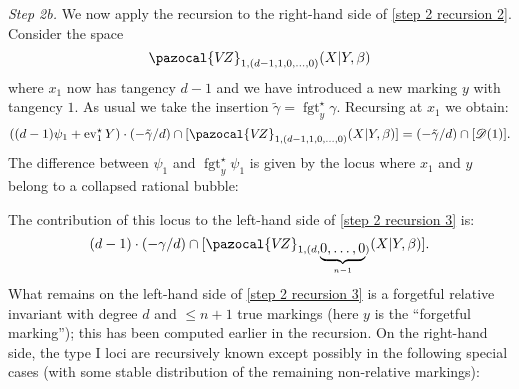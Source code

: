 \documentclass[11pt]{amsart}
\newcommand{\sqC}{\scalebox{0.8}[1.3]{$\sqsubset$}}
\newcommand{\VZ}{\pazocal{V\!Z}}
\newcommand{\st}{\star}
\newcommand{\ev}{\operatorname{ev}}
\newcommand{\fgt}{\operatorname{fgt}}
\newcommand{\Dcal}{\mathcal{D}}
\theoremstyle{definition}
\theoremstyle{definition}
\begin{document}
\noindent \emph{Step 2b.} We now apply the recursion to the right-hand side of \eqref{step 2 recursion 2}. Consider the space
\begin{equation*} \VZ_{1,(d-1,1,0,\ldots,0)}(X|Y,\beta) \end{equation*}
where $x_1$ now has tangency $d-1$ and we have introduced a new marking $y$ with tangency $1$. As usual we take the insertion $\tilde\gamma=\fgt_y^\st \gamma$. Recursing at $x_1$ we obtain:
\begin{equation}\label{step 2 recursion 3} \left( (d-1)\psi_1 + \ev_1^\st Y \right)\cdot(-\tilde\gamma/d) \cap [\VZ_{1,(d-1,1,0,\ldots,0)}(X|Y,\beta)] = (-\tilde\gamma/d) \cap [\Dcal(1)].\end{equation}
The difference between $\psi_1$ and $\fgt_y^\st \psi_1$ is given by the locus where $x_1$ and $y$ belong to a collapsed rational bubble:
\begin{center}
\end{center}
The contribution of this locus to the left-hand side of \eqref{step 2 recursion 3} is:
\begin{equation*} (d-1)\cdot(-\gamma/d) \cap [\VZ_{1,(d,\underbrace{0,\ldots,0}_{n-1})}(X|Y,\beta)].\end{equation*}
What remains on the left-hand side  of \eqref{step 2 recursion 3} is a forgetful relative invariant with degree $d$ and $\leq n+1$ true markings (here $y$ is the ``forgetful marking''); this has been computed earlier in the recursion. On the right-hand side, the type I loci are recursively known except possibly in the following special cases (with some stable distribution of the remaining non-relative markings):
\end{document}
